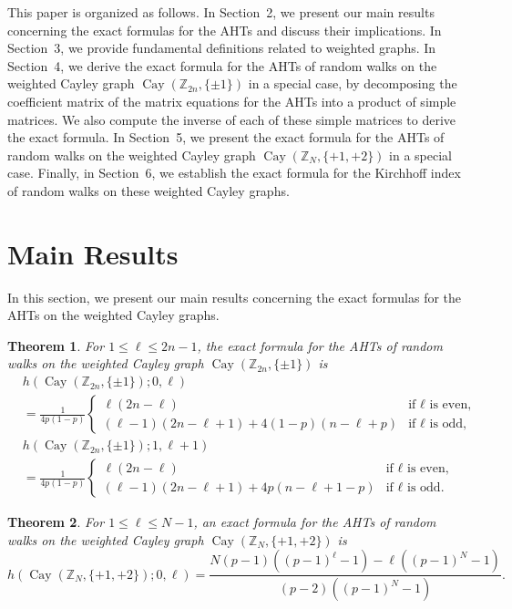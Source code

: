 \documentclass[12pt, leqno]{amsart}
\numberwithin{equation}{section}
\theoremstyle{plain}
\newtheorem{thm}{Theorem}[section]
\theoremstyle{definition}
\newcommand{\ZZ}{\mathbb{Z}}
\newcommand{\0}{\mathbf{0}}
\DeclareMathOperator{\Cay}{Cay}
\begin{document}
This paper is organized as follows.
In Section~2, we present our main results concerning the exact formulas for the AHTs and discuss their implications.
In Section~3, we provide fundamental definitions related to weighted graphs. %
In Section~4, we derive the exact formula for the AHTs of random walks on the weighted Cayley graph $\Cay(\ZZ_{2n},\{\pm1\})$ in a special case, by decomposing the coefficient matrix of the matrix equations for the AHTs into a product of simple matrices.
We also compute the inverse of each of these simple matrices to derive the exact formula.
In Section~5, we present the exact formula for the AHTs of random walks on the weighted Cayley graph $\Cay(\ZZ_N,\{+1,+2\})$ in a special case.
Finally, in Section~6, we establish the exact formula for the Kirchhoff index of random walks on these weighted Cayley graphs.

\section{Main Results}
In this section, we present our main results concerning the exact formulas for the AHTs on the weighted Cayley graphs.

\begin{thm} \label{main1}
For $1\leq \ell\leq 2n-1$, the exact formula for the AHTs of random walks on the weighted Cayley graph $\Cay(\ZZ_{2n},\{\pm1\})$ is
\begin{align*}
&h(\Cay(\ZZ_{2n},\{\pm1\});0,\ell) \\
&=\frac{1}{4p(1-p)}
\begin{cases}
\ell(2n-\ell) &\text{if $\ell$ is even,}\\
(\ell-1)(2n-\ell+1)+4(1-p)(n-\ell+p) &\text{if $\ell$ is odd,}
\end{cases}\\
&h(\Cay(\ZZ_{2n},\{\pm1\});1,\ell+1) \\
&=\frac{1}{4p(1-p)}
\begin{cases}
\ell(2n-\ell) &\text{if $\ell$ is even,}\\
(\ell-1)(2n-\ell+1)+4p(n-\ell+1-p) &\text{if $\ell$ is odd.}
\end{cases}
\end{align*}
\end{thm}

\begin{thm} \label{main2}
For $1\leq \ell\leq N-1$, an exact formula for the AHTs of random walks on the weighted Cayley graph $\Cay(\ZZ_N,\{+1,+2\})$ is
\[
h(\Cay(\ZZ_N,\{+1,+2\});0,\ell)
=\frac{N(p-1)((p-1)^\ell-1)-\ell((p-1)^N-1)}{(p-2)((p-1)^N-1)}.
\]
\end{thm}
\end{document}
